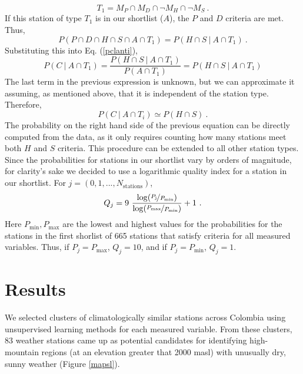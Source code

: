 \documentclass[12pt]{iopart}
\begin{document}
\begin{equation}
T_1=M_P\cap M_D\cap\neg M_H\cap\neg M_S\ .
\end{equation}
If this station of type $T_1$ is in our shortlist ($A$), the $P$ and $D$ criteria are met. Thus,
\begin{equation}
P(P\cap D\cap H\cap S\cap A\cap T_1)=P( H\cap S\ |\ A\cap T_1)\ .
\end{equation}
Substituting this into Eq. (\ref{pclanti}),
\begin{equation}
P(C\ |\ A\cap T_1)=\frac{P( H\cap S\ |\ A\cap T_1)}{P(A\cap T_1)}=P(H\cap S\ |\ A\cap T_1)
\end{equation}
The last term in the previous expression is unknown, but we can approximate it assuming, as mentioned above, that it is independent of the station type. Therefore, 
\begin{equation}
P(C\ |\ A\cap T_i)\simeq P(H\cap S)\ .
\end{equation}
The probability on the right hand side of the previous equation can be directly computed from the data, as it only requires counting how many stations meet both $H$ and $S$ criteria. This procedure can be extended to all other station types.\\

Since the probabilities for stations in our shortlist vary by orders of magnitude, for clarity's sake we decided to use a logarithmic quality index for a station in our shortlist. For $j=(0,1,...,N_\mathrm{stations})$,
\begin{equation}
Q_j=9\ \frac{\log (\nicefrac{P_\mathrm{j}}{P_\mathrm{min}})}{\log (\nicefrac{P_\mathrm{max}}{P_\mathrm{min}})}+1\ .
\end{equation}
Here $P_\mathrm{min},P_\mathrm{max}$ are the lowest and highest values for the probabilities for the stations in the first shorlist of 665 stations that satisfy criteria for all measured variables. Thus, if $P_j=P_\mathrm{max}$, $Q_j=10$, and if $P_j=P_\mathrm{min}$, $Q_j=1$.


\section{Results}

We selected clusters of climatologically similar stations across Colombia using unsupervised learning methods for each measured variable. From these clusters, 83 weather stations came up as potential candidates for identifying high-mountain regions (at an elevation greater that 2000 masl) with unusually dry, sunny weather (Figure \ref{mapsl}).\\
\end{document}
